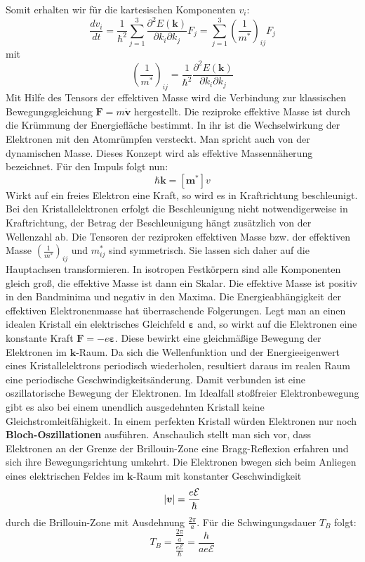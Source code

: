\documentclass[11pt]{article}
\DeclarePairedDelimiter\abs{\lvert}{\rvert}
\begin{document}
Somit erhalten wir für die kartesischen Komponenten $v_i$:
\begin{equation}
  \frac{dv_i}{dt}=\frac{1}{\hbar^2}\sum_{j=1}^{3}\frac{\partial^2E(\bm{k})}
  {\partial k_i\partial k_j}F_j=\sum_{j=1}^{3}\left(\frac{1}{m^*}\right)_{ij}F_j
\end{equation}
mit
\begin{equation}
  \left(\frac{1}{m^*}\right)_{ij}=\frac{1}{\hbar^2}\frac{\partial^2E(\bm{k})}
  {\partial k_i\partial k_j}
\end{equation}
Mit Hilfe des Tensors der effektiven Masse wird die Verbindung zur klassischen
Bewegungsgleichung $\bm{F}=m\dot{\bm{v}}$ hergestellt. Die reziproke effektive
Masse ist durch die Krümmung der Energiefläche bestimmt. In ihr ist die
Wechselwirkung der Elektronen mit den Atomrümpfen versteckt. Man spricht auch
von der dynamischen Masse. Dieses Konzept wird als effektive Massennäherung
bezeichnet. Für den Impuls folgt nun:
\begin{equation}
  \hbar\bm{k}=[ \bm{m}^*] v
\end{equation}
Wirkt auf ein freies Elektron eine Kraft, so wird es in Kraftrichtung
beschleunigt. Bei den Kristallelektronen erfolgt die Beschleunigung nicht
notwendigerweise in Kraftrichtung, der Betrag der Beschleunigung hängt
zusätzlich von der Wellenzahl ab. Die Tensoren der reziproken effektiven Masse
bzw. der effektiven Masse $\left(\frac{1}{m^*}\right)_{ij}$ und $m^*_{ij}$ sind
symmetrisch. Sie lassen sich daher auf die Hauptachsen transformieren. In
isotropen Festkörpern sind alle Komponenten gleich groß, die effektive Masse ist
dann ein Skalar. Die effektive Masse ist positiv in den Bandminima und negativ
in den Maxima. Die Energieabhängigkeit der effektiven Elektronenmasse hat
überraschende Folgerungen. Legt man an einen idealen Kristall ein elektrisches
Gleichfeld $\bm{\varepsilon}$ and, so wirkt auf die Elektronen eine konstante
Kraft $\bm{F}=-e\bm{\varepsilon}$. Diese bewirkt eine gleichmäßige Bewegung
der Elektronen im $\bm{k}$-Raum. Da sich die Wellenfunktion und der
Energieeigenwert eines Kristallelektrons periodisch wiederholen, resultiert
daraus im realen Raum eine periodische Geschwindigkeitsänderung. Damit verbunden
ist eine oszillatorische Bewegung der Elektronen. Im Idealfall stoßfreier
Elektronbewegung gibt es also bei einem unendlich ausgedehnten Kristall keine
Gleichstromleitfähigkeit. In einem perfekten Kristall würden Elektronen nur noch
\textbf{Bloch-Oszillationen} ausführen. Anschaulich stellt man sich vor, dass
Elektronen an der Grenze der Brillouin-Zone eine Bragg-Reflexion erfahren und
sich ihre Bewegungsrichtung umkehrt. Die Elektronen bwegen sich beim Anliegen
eines elektrischen Feldes im $\bm{k}$-Raum mit konstanter Geschwindigkeit
\begin{equation}
  \abs{\bm{v}}=\frac{e\mathcal{E}}{\hbar}
\end{equation}
durch die Brillouin-Zone mit Ausdehnung $\frac{2\pi}{a}$. Für die
Schwingungsdauer $T_B$ folgt:
\begin{equation}
  T_B=\frac{\frac{2\pi}{a}}{\frac{e\mathcal{E}}{\hbar}}=\frac{h}{ae\mathcal{E}}
\end{equation}
\end{document}
